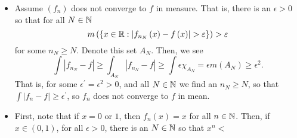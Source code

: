 \documentclass[a4paper]{article}
\begin{document}
\begin{problem}[39]
	\begin{itemize}
		\item Assume \(\left( f_{n} \right) \) does not converge to \(f\) in measure. That is, there is an \(\epsilon > 0\) so that for all \(N \in \mathbb{N}\) \[
		m\left( \{x \in \mathbb{R} : \left| f_{n_{N}}\left( x \right) - f\left( x \right)  \right| > \varepsilon\}  \right) > \varepsilon
		\] for some \(n_{N} \ge N\). Denote this set \(A_{N}\).  Then, we see \[
		\int \left| f_{n_{N}} - f \right| \ge \int_{A_{N}} \left| f_{n_{N}} - f \right|   \ge \int \epsilon \chi_{A_{N}} = \epsilon m\left( A_{N} \right) \ge \epsilon^2
		.\]
		That is, for some \(\epsilon ^{\prime} = \epsilon ^2 > 0\),  and all \(N \in \mathbb{N}\) we find an \(n_N \ge N\), so that \(\int \left| f_{n} - f \right| \ge \epsilon^{\prime}\), so \(f_{n}\) does not converge to \(f\) in mean.
	\item First, note that if \(x = 0\) or \(1\), then \(f_{n}\left( x \right)  = x\) for all \(n \in \mathbb{N}\). Then, if \(x \in \left( 0, 1 \right) \), for all \(\epsilon > 0\), there is an \(N \in \mathbb{N}\) so that \(x^{n} < \)
	\end{itemize}
\end{problem}
\newpage
\end{document}
